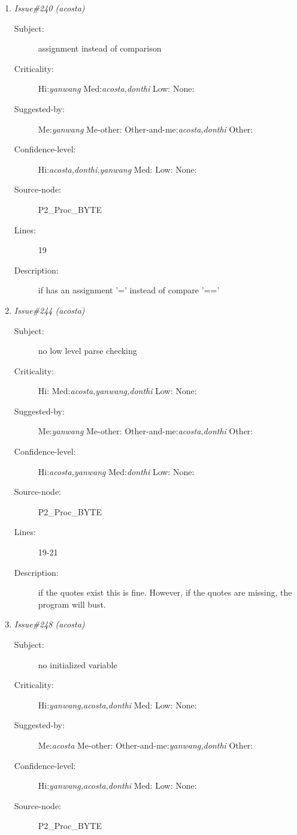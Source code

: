 \begin{enumerate}
\begin{description}
\item [Lines:] 17

\item [Description:] loop initialization should be 8 instead of 6
\end{description}
\item {\it Issue\#240 (acosta)}
\begin{description}
\item [Subject:] assignment instead of comparison
\item [Criticality:] Hi:{\it yanwang} Med:{\it acosta,donthi} Low:{\it } None:{\it }
\item [Suggested-by:] Me:{\it yanwang} Me-other:{\it } Other-and-me:{\it acosta,donthi} Other:{\it }
\item [Confidence-level:] Hi:{\it acosta,donthi,yanwang} Med:{\it } Low:{\it } None:{\it }
\item [Source-node:] P2\_Proc\_BYTE

\item [Lines:] 19

\item [Description:] if has an assignment '=' instead of compare
 '=='
\end{description}
\item {\it Issue\#244 (acosta)}
\begin{description}
\item [Subject:] no low level parse checking
\item [Criticality:] Hi:{\it } Med:{\it acosta,yanwang,donthi} Low:{\it } None:{\it }
\item [Suggested-by:] Me:{\it yanwang} Me-other:{\it } Other-and-me:{\it acosta,donthi} Other:{\it }
\item [Confidence-level:] Hi:{\it acosta,yanwang} Med:{\it donthi} Low:{\it } None:{\it }
\item [Source-node:] P2\_Proc\_BYTE

\item [Lines:] 19-21

\item [Description:] if the quotes exist this is fine. However, if 
the quotes are missing, the program will bust.
\end{description}
\item {\it Issue\#248 (acosta)}
\begin{description}
\item [Subject:] no initialized variable
\item [Criticality:] Hi:{\it yanwang,acosta,donthi} Med:{\it } Low:{\it } None:{\it }
\item [Suggested-by:] Me:{\it acosta} Me-other:{\it } Other-and-me:{\it yanwang,donthi} Other:{\it }
\item [Confidence-level:] Hi:{\it yanwang,acosta,donthi} Med:{\it } Low:{\it } None:{\it }
\item [Source-node:] P2\_Proc\_BYTE


\end{description}
\end{enumerate}
